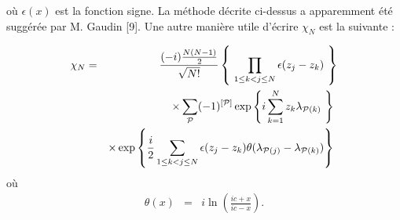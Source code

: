 où $\epsilon(x)$ est la fonction signe. La méthode décrite ci-dessus a apparemment été suggérée par M. Gaudin [9].
Une autre manière utile d'écrire $\chi_N$ est la suivante :

\begin{eqnarray}
	\chi_N & = &	\frac{(-i){\frac{N(N-1)}2}}{ \sqrt{N!}}\left \{  \prod_{1\leq k<j\leq N} \epsilon (z_j -z_k ) \right \}\notag \\
	&&  \times \sum_{\mathcal{P}} (-1)^{[\mathcal{P}]} \exp \left \{ i \sum_{k = 1}^N  z_k \lambda_{ \mathcal{P}(k) } \right \} \notag \\
	&& \times \exp \left \{  \frac{i}{2} \sum_{1\leq k<j\leq N} \epsilon (z_j -z_k ) \theta(\lambda_{\mathcal{P}(j)}- \lambda_{\mathcal{P}(k)}  )  \right \} \label{eq.1.26} 
\end{eqnarray}
où
\begin{eqnarray*}
	\theta ( x ) & = & i \ln \left ( \frac{ic + x }{ic - x } \right ) .
\end{eqnarray*}
